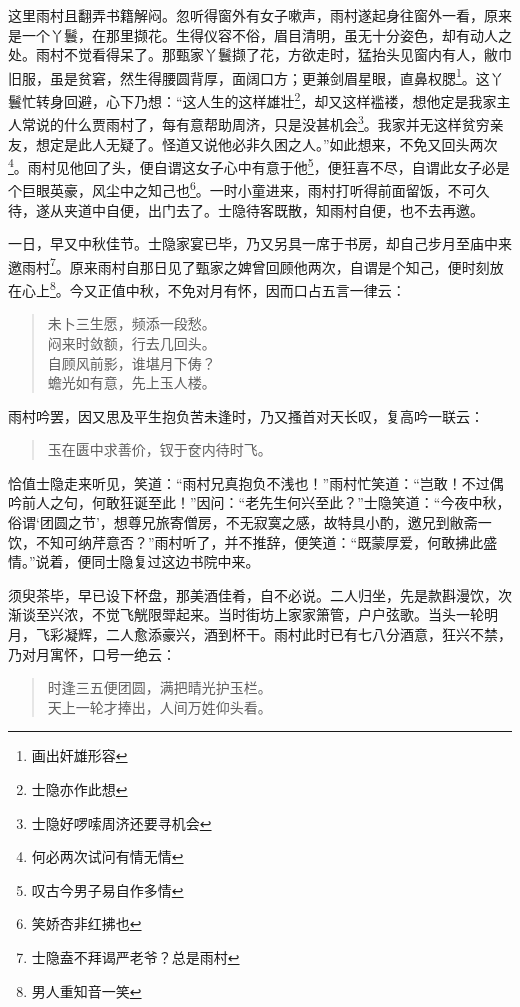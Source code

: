 \documentclass[12pt,oneside]{book}
\newenvironment{shici}{%
\begin{verse}%
\centering\large\hspace{12pt}}%
{\end{verse}}
\begin{document}
这里雨村且翻弄书籍解闷。忽听得窗外有女子嗽声，雨村遂起身往窗外一看，原来是一个丫鬟，在那里撷花。生得仪容不俗，眉目清明，虽无十分姿色，却有动人之处。雨村不觉看得呆了。那甄家丫鬟撷了花，方欲走时，猛抬头见窗内有人，敝巾旧服，虽是贫窘，然生得腰圆背厚，面阔口方；更兼剑眉星眼，直鼻权腮\footnote{画出奸雄形容}。这丫鬟忙转身回避，心下乃想：“这人生的这样雄壮\footnote{士隐亦作此想}，却又这样褴褛，想他定是我家主人常说的什么贾雨村了，每有意帮助周济，只是没甚机会\footnote{士隐好啰嗦周济还要寻机会}。我家并无这样贫穷亲友，想定是此人无疑了。怪道又说他必非久困之人。”如此想来，不免又回头两次\footnote{何必两次试问有情无情}。雨村见他回了头，便自谓这女子心中有意于他\footnote{叹古今男子易自作多情}，便狂喜不尽，自谓此女子必是个巨眼英豪，风尘中之知己也\footnote{笑娇杏非红拂也}。一时小童进来，雨村打听得前面留饭，不可久待，遂从夹道中自便，出门去了。士隐待客既散，知雨村自便，也不去再邀。

一日，早又中秋佳节。士隐家宴已毕，乃又另具一席于书房，却自己步月至庙中来邀雨村\footnote{士隐盍不拜谒严老爷？总是雨村}。原来雨村自那日见了甄家之婢曾回顾他两次，自谓是个知己，便时刻放在心上\footnote{男人重知音一笑}。今又正值中秋，不免对月有怀，因而口占五言一律云：

\begin{shici}
未卜三生愿，频添一段愁。\\
闷来时敛额，行去几回头。\\
自顾风前影，谁堪月下俦？\\
蟾光如有意，先上玉人楼。
\end{shici}


雨村吟罢，因又思及平生抱负苦未逢时，乃又搔首对天长叹，复高吟一联云：

\begin{shici}
玉在匮中求善价，钗于奁内待时飞。
\end{shici}


恰值士隐走来听见，笑道：“雨村兄真抱负不浅也！”雨村忙笑道：“岂敢！不过偶吟前人之句，何敢狂诞至此！”因问：“老先生何兴至此？”士隐笑道：“今夜中秋，俗谓‘团圆之节’，想尊兄旅寄僧房，不无寂寞之感，故特具小酌，邀兄到敝斋一饮，不知可纳芹意否？”雨村听了，并不推辞，便笑道：“既蒙厚爱，何敢拂此盛情。”说着，便同士隐复过这边书院中来。

须臾茶毕，早已设下杯盘，那美酒佳肴，自不必说。二人归坐，先是款斟漫饮，次渐谈至兴浓，不觉飞觥限斝起来。当时街坊上家家箫管，户户弦歌。当头一轮明月，飞彩凝辉，二人愈添豪兴，酒到杯干。雨村此时已有七八分酒意，狂兴不禁，乃对月寓怀，口号一绝云：

\begin{shici}
时逢三五便团圆，满把晴光护玉栏。\\
天上一轮才捧出，人间万姓仰头看。
\end{shici}
\end{document}
